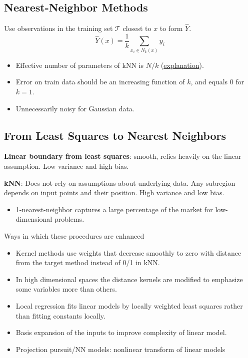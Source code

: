 \subsection{Nearest-Neighbor Methods}
Use observations in the training set $\mathcal{T}$ closest to $x$ to form $\hat{Y}$. 
\begin{equation*}
	\hat{Y}(x)=\frac{1}{k}\sum_{x_i\in N_k(x)}y_i
\end{equation*}
\begin{itemize}
	\item Effective number of parameters of kNN is $N/k$ (\href{https://stats.stackexchange.com/questions/357524/why-is-n-k-the-effective-number-of-parameters-in-k-nn}{explanation}). 
	\item Error on train data should be an increasing function of $k$, and equals $0$ for $k=1$. 
	\item Unnecessarily noisy for Gaussian data. 
\end{itemize}
\subsection{From Least Squares to Nearest Neighbors}
\textbf{Linear boundary from least squares}: smooth, relies heavily on the linear assumption. Low variance and high bias. 

\textbf{kNN}: Does not rely on assumptions about underlying data. Any subregion depends on input points and their position. High variance and low bias. 
\begin{itemize}
	\item 1-nearest-neighbor captures a large percentage of the market for low-dimensional problems. 
\end{itemize}

Ways in which these procedures are enhanced
\begin{itemize}
	\item Kernel methods use weights that decrease smoothly to zero with distance from the target method instead of 0/1 in kNN. 
	\item In high dimensional spaces the distance kernels are modified to emphasize some variables more than others. 
	\item Local regression fits linear models by locally weighted least squares rather than fitting constants locally. 
	\item Basis expansion of the inputs to improve complexity of linear model. 
	\item Projection pursuit/NN models: nonlinear transform of linear models
\end{itemize}

